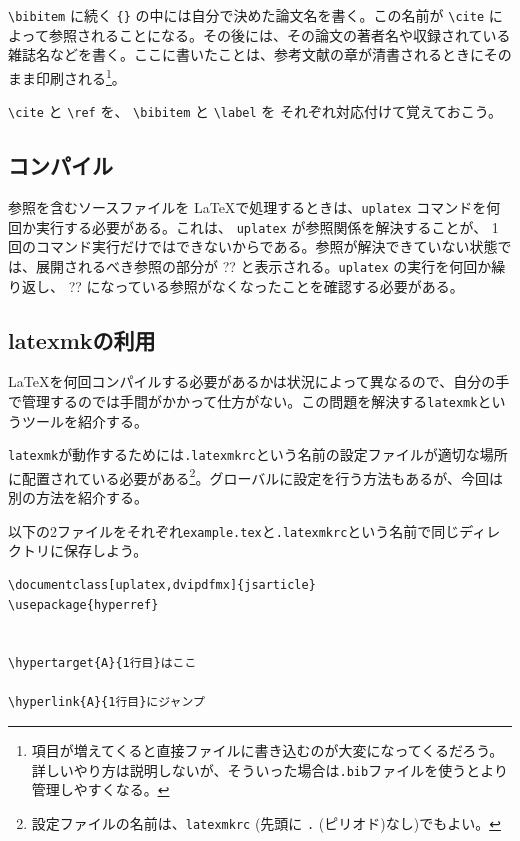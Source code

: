 \verb|\bibitem| に続く \texttt{\{\}} の中には自分で決めた論文名を書く。この名前が \verb|\cite| によって参照されることになる。その後には、その論文の著者名や収録されている雑誌名などを書く。ここに書いたことは、参考文献の章が清書されるときにそのまま印刷される\footnote{項目が増えてくると直接ファイルに書き込むのが大変になってくるだろう。詳しいやり方は説明しないが、そういった場合は\texttt{.bib}ファイルを使うとより管理しやすくなる。}。

\verb|\cite| と \verb|\ref| を、 \verb|\bibitem| と \verb|\label| を
それぞれ対応付けて覚えておこう。

\subsection{コンパイル}
\label{sec:latex:compile}

参照を含むソースファイルを \LaTeX で処理するときは、\texttt{uplatex} コマンドを何回か実行する必要がある。これは、 \texttt{uplatex} が参照関係を解決することが、 1 回のコマンド実行だけではできないからである。参照が解決できていない状態では、展開されるべき参照の部分が ?? と表示される。\texttt{uplatex} の実行を何回か繰り返し、 ?? になっている参照がなくなったことを確認する必要がある。

\subsection{latexmkの利用}
\label{sec:latex:latexmk}

\LaTeX を何回コンパイルする必要があるかは状況によって異なるので、自分の手で管理するのでは手間がかかって仕方がない。この問題を解決する\texttt{latexmk}というツールを紹介する。

\texttt{latexmk}が動作するためには\texttt{.latexmkrc}という名前の設定ファイルが適切な場所に配置されている必要がある\footnote{設定ファイルの名前は、\texttt{latexmkrc} (先頭に \texttt{.} (ピリオド)なし)でもよい。}。グローバルに設定を行う方法もあるが、今回は別の方法を紹介する。

以下の2ファイルをそれぞれ\texttt{example.tex}と\texttt{.latexmkrc}という名前で同じディレクトリに保存しよう。

\begin{reidai}
    \begin{verbatim}
\documentclass[uplatex,dvipdfmx]{jsarticle}
\usepackage{hyperref}


\hypertarget{A}{1行目}はここ

\hyperlink{A}{1行目}にジャンプ

\end{verbatim}
\end{reidai}

